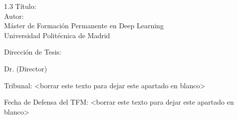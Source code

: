 
\begin{spacing}{1.3}
Título: \thesisTitle \\
Autor: \thesisAuthor\\
Máster de Formación Permanente en Deep Learning\\
Universidad Politécnica de Madrid\end{spacing}
Dirección de Tesis: 
\begin{mydescription}
    \item Dr. \supervisorDetails  (Director)
    \item \cosupervisorDetails
\end{mydescription}

\vspace{10 mm}

\vspace{30 mm}

Tribunal: <borrar este texto para dejar este apartado en blanco>


\vspace{50mm}



Fecha de Defensa del TFM: <borrar este texto para dejar este apartado en blanco>



\vspace{\fill}

